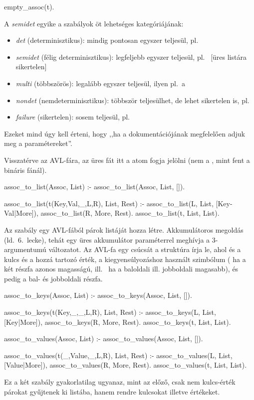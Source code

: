 \begin{program*}
empty_assoc(t).
\end{program*}
A \emph{semidet} egyike a szabályok öt lehetséges
kategóriájának:
\begin{itemize}
\item \emph{det} (determinisztikus): mindig pontosan
  egyszer teljesül, pl.~
\item \emph{semidet} (félig determinisztikus):
  legfeljebb egyszer teljesül, pl.~ [üres listára sikertelen]
\item \emph{multi} (többszörös): legalább egyszer
  teljesül, ilyen pl.~a 
\item \emph{nondet} (nemdeterminisztikus): többször
  teljesülhet, de lehet sikertelen is,
  pl.~
\item \emph{failure} (sikertelen): sosem teljesül,
  pl.~
\end{itemize}
Ezeket mind úgy kell érteni, hogy ,,ha a
dokumentációjának megfelelően adjuk meg a
paramétereket''.

Visszatérve az AVL-fára, az üres fát itt a 
atom fogja jelölni (nem a \pr{-}, mint fent a
bináris fánál).

\begin{program*}
assoc_to_list(Assoc, List) :-
    assoc_to_list(Assoc, List, []).

assoc_to_list(t(Key,Val,_,L,R), List, Rest) :-
    assoc_to_list(L, List, [Key-Val|More]),
    assoc_to_list(R, More, Rest).
assoc_to_list(t, List, List).
\end{program*}
Az  szabály egy AVL-fából párok
listáját hozza létre. Akkumulátoros megoldás
(ld.~6.~lecke), tehát egy üres akkumulátor
paraméterrel meghívja a 3-argumentumú változatot. Az
AVL-fa egy csúcsát a  struktúra
írja le, ahol  és  a kulcs és a hozzá
tartozó érték,  a kiegyensúlyozáshoz használt
szimbólum (\pr{-} ha a két részfa azonos magasságú,
\pr{<} ill.~\pr{>} ha a baloldali ill. jobboldali
magasabb),  és  pedig a bal- és
jobboldali részfa.

\begin{program*}
assoc_to_keys(Assoc, List) :-
    assoc_to_keys(Assoc, List, []).

assoc_to_keys(t(Key,_,_,L,R), List, Rest) :-
    assoc_to_keys(L, List, [Key|More]),
    assoc_to_keys(R, More, Rest).
assoc_to_keys(t, List, List).

assoc_to_values(Assoc, List) :-
    assoc_to_values(Assoc, List, []).

assoc_to_values(t(_,Value,_,L,R), List, Rest) :-
    assoc_to_values(L, List, [Value|More]),
    assoc_to_values(R, More, Rest).
assoc_to_values(t, List, List).
\end{program*}
Ez a két szabály gyakorlatilag ugyanaz, mint az
előző, csak nem kulcs-érték párokat gyűjtenek ki
listába, hanem rendre kulcsokat illetve értékeket.

